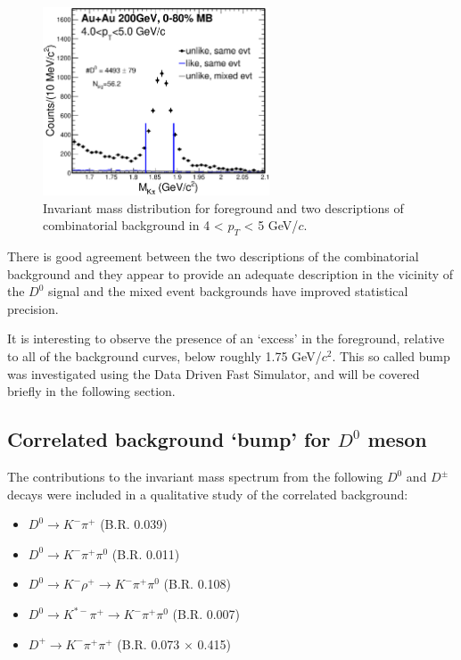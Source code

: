 \begin{figure}[htbp]
\centering
\includegraphics[keepaspectratio,width=0.6\textwidth]{figure/Run14_D0HFT/Mixed_cent_1_9_pt_4_5.eps}
\caption{Invariant mass distribution for foreground and two descriptions of combinatorial background in 4 < $p_T$ < 5 GeV/$c$.}
\label{fig:mixedEvent_pt4_5}
\end{figure}

There is good agreement between the two descriptions of the combinatorial background and they appear to provide an adequate description in the vicinity of the $D^0$ signal and the mixed event backgrounds have improved statistical precision.

It is interesting to observe the presence of an `excess' in the foreground, relative to all of the background curves, below roughly 1.75 GeV/$c^2$.  This so called bump was investigated using the Data Driven Fast Simulator, and will be covered briefly in the following section.

\subsection{Correlated background `bump' for $D^0$ meson}

The contributions to the invariant mass spectrum from the following $D^0$ and $D^\pm$ decays were included in a qualitative study of the correlated background: 

\begin{itemize}
\item $D^0 \rightarrow K^-\pi^+$ (B.R. 0.039)
\item $D^0 \rightarrow  K^-\pi^+\pi^0$ (B.R. 0.011)
\item $D^0 \rightarrow  K^-\rho^+ \rightarrow K^-\pi^+\pi^0$ (B.R. 0.108)
\item $D^0 \rightarrow  K^{*-}\pi^+\rightarrow K^-\pi^+\pi^0$ (B.R. 0.007)
\item $D^+ \rightarrow  K^-\pi^+\pi^+$ (B.R. 0.073 $\times$ 0.415)
\end{itemize}


